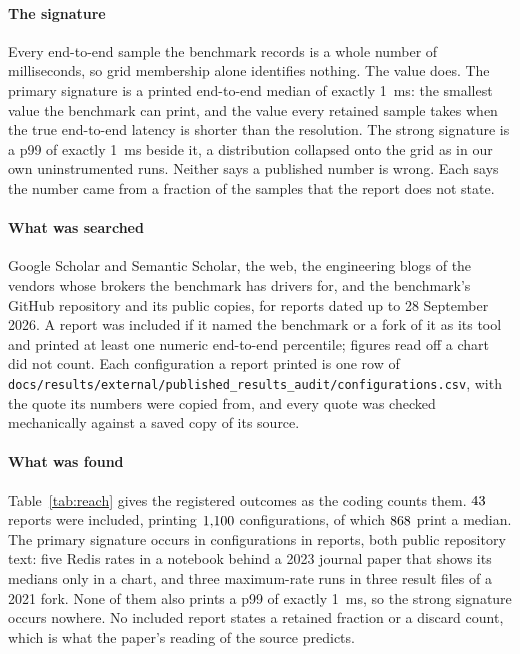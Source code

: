 \documentclass[10pt,journal,onecolumn]{IEEEtran}
\newcommand{\redis}{Redis}
\begin{document}
\paragraph{The signature} Every end-to-end sample the benchmark records is a whole number of
milliseconds, so grid membership alone identifies nothing. The value does. The primary
signature is a printed end-to-end median of exactly 1~ms: the smallest value the benchmark can
print, and the value every retained sample takes when the true end-to-end latency is shorter than
the resolution. The strong signature is a p99 of exactly 1~ms beside it, a distribution collapsed
onto the grid as in our own uninstrumented runs. Neither says a published number is wrong. Each
says the number came from a fraction of the samples that the report does not state.

\paragraph{What was searched} Google Scholar and Semantic Scholar, the web, the engineering
blogs of the vendors whose brokers the benchmark has drivers for, and the benchmark's GitHub
repository and its public copies, for reports dated up to 28 September 2026. A report was
included if it named the benchmark or a fork of it as its tool and printed at least one numeric
end-to-end percentile; figures read off a chart did not count. Each configuration a report
printed is one row of \texttt{docs/results/external/published\_results\_audit/configurations.csv},
with the quote its numbers were copied from, and every quote was checked mechanically against a
saved copy of its source.

\paragraph{What was found} Table~\ref{tab:reach} gives the registered outcomes as the coding
counts them. $43$ reports were included, printing $1{,}100$ configurations, of
which $868$ print a median. The primary
signature occurs in \reachPrimaryConfigsWord{} configurations in \reachPrimaryReportsWord{}
reports, both public repository text: five \redis{} rates in a notebook behind a 2023 journal
paper that shows its medians only in a chart, and three maximum-rate runs in three result files
of a 2021 fork. None of them also prints a p99 of exactly 1~ms, so the strong signature occurs
nowhere. No included report states a retained fraction or a discard count, which is what the
paper's reading of the source predicts.
\end{document}
